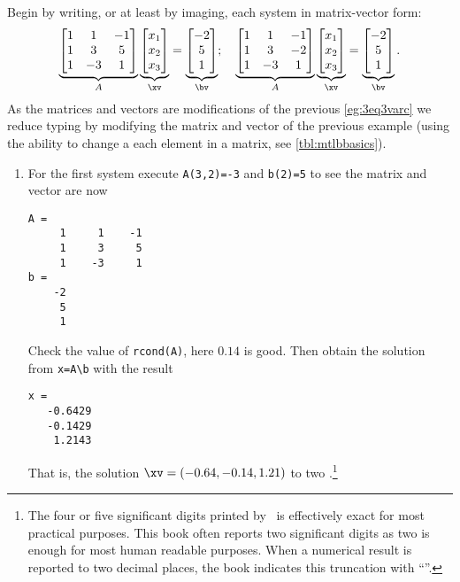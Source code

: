 \begin{example}
\begin{solution} 
Begin by writing, or at least by imaging, each system in matrix-vector form:
\begin{equation*}
\underbrace{\begin{bmatrix} 1&1&-1\\ 1&3&5\\1&-3&1 \end{bmatrix}}_A
\underbrace{\begin{bmatrix} x_1\\x_2\\x_3 \end{bmatrix}}_\xv
=\underbrace{\begin{bmatrix} -2\\5\\1 \end{bmatrix}}_\bv ;
\quad
\underbrace{\begin{bmatrix} 1&1&-1\\ 1&3&-2\\1&-3&1 \end{bmatrix}}_A
\underbrace{\begin{bmatrix} x_1\\x_2\\x_3 \end{bmatrix}}_\xv
=\underbrace{\begin{bmatrix} -2\\5\\1 \end{bmatrix}}_\bv .
\end{equation*}
As the matrices and vectors are modifications of the previous \autoref{eg:3eq3varc} we reduce typing by modifying the matrix and vector of the previous example (using the ability to change a each element in a matrix, see \autoref{tbl:mtlbbasics}).
\begin{enumerate}
\item For the first system execute \verb|A(3,2)=-3| and \verb|b(2)=5|
to see the matrix and vector are now
\begin{verbatim}
A =
     1     1    -1
     1     3     5
     1    -3     1
b =
    -2
     5
     1
\end{verbatim}
Check the value of \verb|rcond(A)|, here \(0.14\) is good.
Then obtain the solution from \verb|x=A\b| with the result
\begin{verbatim}
x =
   -0.6429
   -0.1429
    1.2143
\end{verbatim}
That is, the solution \(\xv=(-0.64,-0.14,1.21)\) to two  \twodp.\footnote{The four or five significant digits printed by \script\ is effectively exact for most practical purposes.
This book often reports two significant digits as two is enough for most human readable purposes.
When a numerical result is reported to two decimal places, the book indicates this truncation with ``\twodp''.}


\end{enumerate}
\end{solution}
\end{example}
